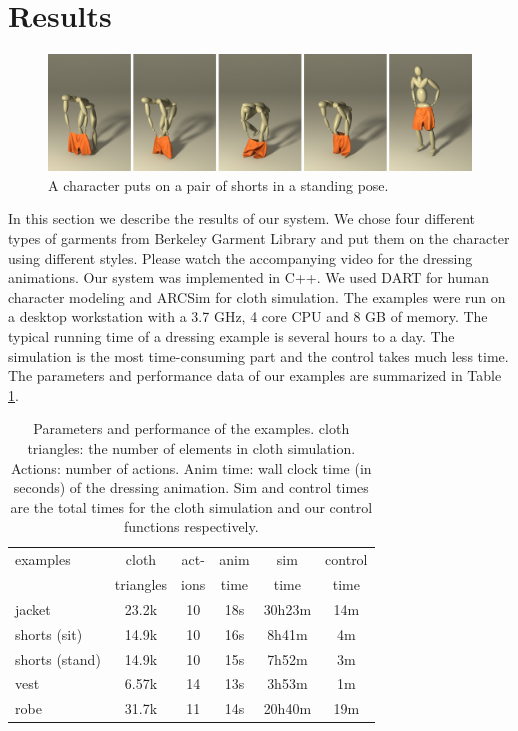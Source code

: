 \section{Results}



\begin{figure}[!t]
  \centering
  \includegraphics[width=\textwidth]{images/shortsStanding}
  \caption{A character puts on a pair of shorts in a standing pose.}
  \label{fig:shorts2}
\end{figure}

In this section we describe the results of our system. We chose four different types of garments from Berkeley Garment Library \cite{}  and put them on the character using different styles. Please watch the accompanying video for the dressing animations. Our system was implemented in C++. We used DART \cite{} for human character modeling and ARCSim \cite{} for cloth simulation. The examples were run on a desktop workstation with a 3.7 GHz, 4 core CPU and 8 GB of memory. The typical running time of a dressing example is several hours to a day. The simulation is the most time-consuming part and the control takes much less time. The parameters and performance data of our examples are summarized in Table \ref{table:data}. 

\begin{table}
  \centering
  \begin{tabular}{|l|c|c|c|c|c|}
    \hline
    examples 		& cloth 	& act- 	& anim	& sim 		& control \\
                        & triangles & 	ions	& time 	& time 		& time \\
    \hline
    jacket 		& 23.2k  	& 10		& 18s 	&30h23m	&  14m  \\
    shorts (sit) 	& 14.9k 	& 10		& 16s 	&  8h41m 	& 4m \\
    shorts (stand)	& 14.9k 	& 10		& 15s	&  7h52m	& 3m \\
    vest 		& 6.57k		& 14		& 13s	&  3h53m	& 1m   \\
    robe 		& 31.7k 	& 11		& 14s			& 20h40m		& 19m  \\
    \hline
  \end{tabular}
  \caption{Parameters and performance of the examples. cloth triangles: the number of elements in cloth simulation. Actions: number of actions. Anim time: wall clock time (in seconds) of the dressing animation. Sim and control times are the total times for the cloth simulation and our control functions respectively.}
  \label{table:data}
\end{table}

